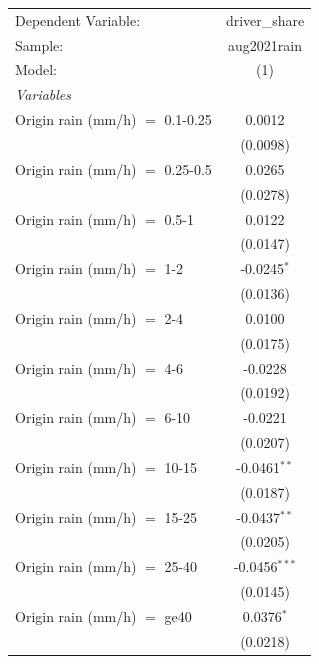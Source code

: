 \ifdefined\ifclassloaded
{}
\fi

\begingroup
\centering
\begin{tabular}{lc}
   \tabularnewline \midrule \midrule
   Dependent Variable:             & driver\_share\\   
   Sample:                         & aug2021rain \\   
   Model:                          & (1)\\  
   \midrule
   \emph{Variables}\\
   Origin rain (mm/h) $=$ 0.1-0.25 & 0.0012\\   
                                   & (0.0098)\\   
   Origin rain (mm/h) $=$ 0.25-0.5 & 0.0265\\   
                                   & (0.0278)\\   
   Origin rain (mm/h) $=$ 0.5-1    & 0.0122\\   
                                   & (0.0147)\\   
   Origin rain (mm/h) $=$ 1-2      & -0.0245$^{*}$\\   
                                   & (0.0136)\\   
   Origin rain (mm/h) $=$ 2-4      & 0.0100\\   
                                   & (0.0175)\\   
   Origin rain (mm/h) $=$ 4-6      & -0.0228\\   
                                   & (0.0192)\\   
   Origin rain (mm/h) $=$ 6-10     & -0.0221\\   
                                   & (0.0207)\\   
   Origin rain (mm/h) $=$ 10-15    & -0.0461$^{**}$\\   
                                   & (0.0187)\\   
   Origin rain (mm/h) $=$ 15-25    & -0.0437$^{**}$\\   
                                   & (0.0205)\\   
   Origin rain (mm/h) $=$ 25-40    & -0.0456$^{***}$\\   
                                   & (0.0145)\\   
   Origin rain (mm/h) $=$ ge40     & 0.0376$^{*}$\\   
                                   & (0.0218)\\   

\end{tabular}
